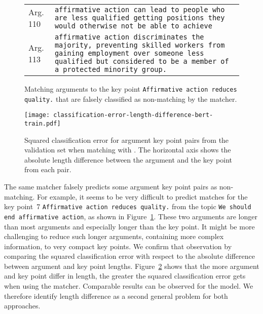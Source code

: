 \begin{figure}
    \begin{tabularx}{\linewidth}{@{}p{2em}X@{}}
        Arg. 110 & \texttt{affirmative action can lead to people who are less qualified getting positions they would otherwise not be able to achieve} \\
        Arg. 113 & \texttt{affirmative action discriminates the majority, preventing skilled workers from gaining employment over someone less qualified but considered to be a member of a protected minority group.}
    \end{tabularx}
    \caption{Matching arguments to the key point \texttt{Affirmative action reduces quality.} that are falsely classified as non-matching by the \BertBase matcher.}
    \label{example-5-110-113}
\end{figure}
\begin{figure}
    \texttt{[image: classification-error-length-difference-bert-train.pdf]}
    \caption{Squared classification error for argument key point pairs from the validation set when matching with \BertBase. The horizontal axis shows the absolute length difference between the argument and the key point from each pair.}
    \label{classification-error-length}
\end{figure}
The same \BertBase matcher falsely predicts some argument key point pairs as non-matching.
For example, it seems to be very difficult to predict matches for the key point~7 \texttt{Affirmative action reduces quality.} from the topic \texttt{We should end affirmative action}, as shown in Figure~\ref{example-5-110-113}. These two arguments are longer than most arguments %
and especially longer than the key point.
It might be more challenging to reduce such longer arguments, containing more complex information, to very compact key points.
We confirm that observation by comparing the squared classification error with respect to the absolute difference between argument and key point lengths.
Figure~\ref{classification-error-length} shows that the more argument and key point differ in length, the greater the squared classification error gets when using the \BertBase matcher.
Comparable results can be observed for the \Roberta model.
We therefore identify length difference as a second general problem for both approaches.


